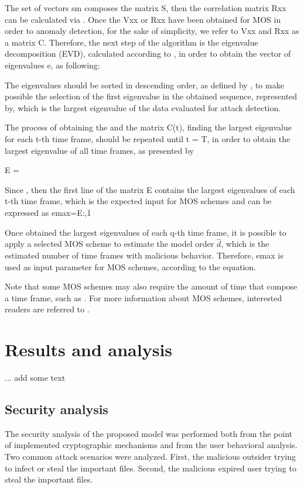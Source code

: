 \documentclass[twocolumn]{svjour3}          %
\begin{document}
The set of vectors sm composes the matrix S, then the correlation matrix Rxx can be calculated via 
. Once the Vxx or Rxx have been obtained for MOS in order to anomaly detection, for the sake of simplicity, we refer to Vxx and Rxx as a matrix C. Therefore, the next step of the algorithm is the eigenvalue decomposition (EVD), calculated according to , in order to obtain the vector of eigenvalues e, as following:



The eigenvalues should be sorted in descending order, as defined by , to make possible the selection of the first eigenvalue in the obtained sequence, represented by, which is the largest eigenvalue of the data evaluated for attack detection.

The process of obtaining the and the matrix C(t), finding the largest eigenvalue for each t-th time frame, should be repeated until t = T, in order to obtain the largest eigenvalue of all time frames, as presented by 

E =                                                                                             

Since   , then the first line of the matrix E contains the largest eigenvalues of each t-th time frame, which is the expected input for MOS schemes and can be expressed as 
emax=E{:,1}

Once obtained the largest eigenvalues of each q-th time frame, it is possible to apply a selected MOS scheme to estimate the model order $\hat{d}$, which is the estimated number of time frames with malicious behavior. Therefore, emax is used as input parameter for MOS schemes, according to the equation.

Note that some MOS schemes may also require the amount of time that compose a time frame, such as . For more information about MOS schemes, interested readers are referred to \cite{da2009comparison}.

\section{Results and analysis}
\label{sec_results}

... add some text

\subsection{Security analysis}
\label{sec_sec_analysis}
The security analysis of the proposed model was performed both from the point of implemented cryptographic mechanisms and from the user behavioral analysis. Two common attack scenarios were analyzed. First, the malicious outsider trying to infect or steal the important files. Second, the malicious expired user trying to steal the important files. 
\end{document}
